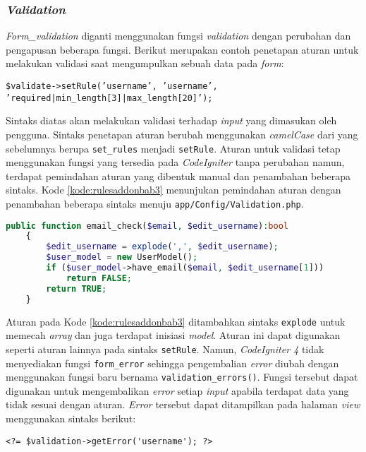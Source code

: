 \subsubsection{\textit{Validation}}
\textit{Form\_validation} diganti menggunakan fungsi \textit{validation} dengan perubahan dan pengapusan beberapa fungsi. Berikut merupakan contoh penetapan aturan untuk melakukan validasi saat mengumpulkan sebuah data pada \textit{form}:
\begin{center}
\texttt{\$validate->setRule('username', 'username', 'required|min\_length[3]|max\_length[20]');}
\end{center}
Sintaks diatas akan melakukan validasi terhadap \textit{input} yang dimasukan oleh pengguna. Sintaks penetapan aturan berubah menggunakan \textit{camelCase} dari yang sebelumnya berupa \texttt{set\_rules} menjadi \texttt{setRule}. Aturan untuk validasi tetap menggunakan fungsi yang tersedia pada \textit{CodeIgniter} tanpa perubahan namun, terdapat pemindahan aturan yang dibentuk manual dan penambahan beberapa sintaks. Kode \ref{kode:rulesaddonbab3} menunjukan pemindahan aturan dengan penambahan beberapa sintaks menuju \texttt{app/Config/Validation.php}.
\begin{lstlisting}[language=PHP, caption=Contoh perubahan penambahan sintaks pada aturan yang dibentuk manual, label=kode:rulesaddonbab3]
		public function email_check($email, $edit_username):bool
	{
		$edit_username = explode(',', $edit_username);
        $user_model = new UserModel();
		if ($user_model->have_email($email, $edit_username[1]))
			return FALSE;
		return TRUE;
	}
\end{lstlisting}

Aturan pada Kode \ref{kode:rulesaddonbab3} ditambahkan sintaks \texttt{explode} untuk memecah \textit{array} dan juga terdapat inisiasi \textit{model}. Aturan ini dapat digunakan seperti aturan lainnya pada sintaks \texttt{setRule}. Namun, \textit{CodeIgniter 4} tidak menyediakan fungsi \texttt{form\_error} sehingga pengembalian \textit{error} diubah dengan menggunakan fungsi baru bernama \texttt{validation\_errors()}. Fungsi tersebut dapat digunakan untuk mengembalikan \textit{error} setiap \textit{input} apabila terdapat data yang tidak sesuai dengan aturan. \textit{Error} tersebut dapat ditampilkan pada halaman \textit{view} menggunakan sintaks berikut:

\begin{center}
\verb|<?= $validation->getError('username'); ?>|
\end{center}

